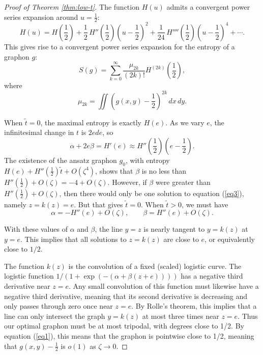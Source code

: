 \documentclass[10pt,a4paper]{amsart}
\begin{document}
\begin{proof}[Proof of Theorem \ref{thm:low-t}]
\medskip

 The function $H(u)$
admits a convergent power series expansion around $u=\frac12$: 
\begin{equation}
H(u) = H\left (\frac12 \right ) + \frac12 \, H''\left ( \frac12 \right ) \left ( u-\frac12
\right )^2 + \frac{1}{24} \, H''''\left ( \frac12 \right ) \left (u-\frac12 \right )^4
+ \cdots.
\end{equation}
This gives rise to a convergent power series expansion for the entropy of a graphon $g$:
\begin{equation}
S(g) = \sum_{k=0}^\infty \frac{\mu_{2k}}{(2k)!} H^{(2k)}\left (\frac12\right ),
\end{equation}
where 
\begin{equation}
\mu_{2k} = \iint \left (g(x,y)-\frac12\right )^{2k} \,dx\,dy.
\end{equation}

When $\tilde t = 0$, the maximal entropy is exactly $H(e)$. As we vary $e$, the infinitesimal change in $t$ is $2e de$, so 
\begin{equation}
\alpha + 2e \beta = H'(e) \approx H''\left (\frac12 \right ) \left (e-\frac12\right ). 
\end{equation} 
The existence of the ansatz graphon $g_0$, with entropy $H(e) + H''(\frac12) \tilde t
+ O(\zeta^4)$, shows that $\beta$ is no less than 
$H''(\frac12) + O(\zeta) = -4+O(\zeta)$. However, if $\beta$ were greater than 
$H''(\frac12) + O(\zeta)$, then there would only be one solution to equation (\ref{eq3}),
namely $z=k(z)=e$. But that gives $\tilde t = 0$. When $\tilde t >0$, we must have 
\begin{equation}
\alpha = -H''(e) + O(\zeta), \qquad \beta = H''(e) + O(\zeta).
\end{equation}

\smallskip

 With these values of $\alpha$ and $\beta$, the line $y=z$ is 
nearly tangent to $y=k(z)$ at $y=e$. This implies that all solutions to $z=k(z)$ are 
close to $e$, or equivalently close to $1/2$. 

The function $k(z)$ is the convolution of a fixed (scaled) logistic curve. The 
logistic function $1/(1+\exp(-(\alpha+\beta(z+e))))$ has a negative third derivative near $z=e$. Any small convolution
of this function must likewise have a negative third derivative, meaning that its 
second derivative is decreasing and only passes through zero once near $z=e$. 
By Rolle's theorem, this implies 
that a line can only intersect the graph $y=k(z)$ at most three times near $z=e$.
Thus our optimal graphon must be at most tripodal, with degrees close to 1/2. By
equation (\ref{eq1}), this means that the graphon is pointwise close to 1/2, meaning
that $g(x,y) - \frac12$ is $o(1)$ as $\zeta \to 0$. 


\end{proof}
\end{document}
